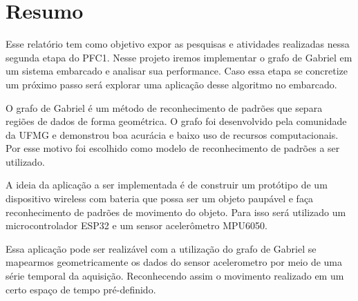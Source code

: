 \section{Resumo}

Esse relatório tem como objetivo expor as pesquisas e atividades realizadas nessa segunda etapa do PFC1.
Nesse projeto iremos implementar o grafo de Gabriel em um sistema embarcado e analisar sua performance. Caso essa etapa se concretize 
um próximo passo será explorar uma aplicação desse algoritmo no embarcado. 

O grafo de Gabriel\cite{GabrielGraph1} é um método de reconhecimento de padrões que separa regiões de dados de forma geométrica. O grafo foi 
desenvolvido pela comunidade da UFMG e demonstrou boa acurácia e baixo uso de recursos computacionais.
Por esse motivo foi escolhido como modelo de reconhecimento de padrões a ser utilizado.

A ideia da aplicação a ser implementada é de construir um protótipo de um dispositivo wireless com bateria que possa 
ser um objeto paupável e faça reconhecimento de padrões de movimento do objeto. Para isso será utilizado um microcontrolador ESP32 
e um sensor acelerômetro MPU6050.

Essa aplicação pode ser realizável com a utilização do grafo de Gabriel se mapearmos geometricamente os dados do sensor acelerometro por meio de uma
série temporal da aquisição. Reconhecendo assim o movimento realizado em um certo espaço de tempo pré-definido.
